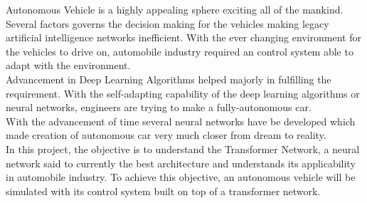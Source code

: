 Autonomous Vehicle is a highly appealing sphere exciting all of the mankind. Several factors governs the decision making for the vehicles making legacy artificial intelligence networks inefficient. With the ever changing environment for the vehicles to drive on, automobile industry required an control system able to adapt with the environment.
\\
Advancement in Deep Learning Algorithms helped majorly in fulfilling the requirement. With the self-adapting capability of the deep learning algorithms or neural networks, engineers are trying to make a fully-autonomous car.
\\
With the advancement of time several neural networks have be developed which made creation of autonomous car very much closer from dream to reality.
\\
In this project, the objective is to understand the Transformer Network, a neural network said to currently the best architecture and understands its applicability in automobile industry. To achieve this objective, an autonomous vehicle will be simulated with its control system built on top of a transformer network. 
